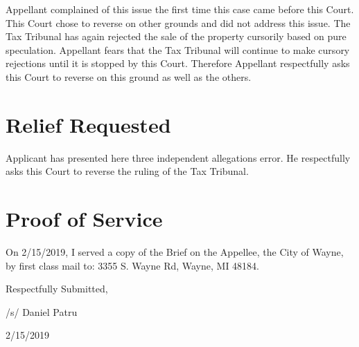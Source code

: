 \documentclass[12pt,\documentclassflag]{michiganCourtOfAppealsBrief}
\begin{document}
Appellant complained of this issue the first time this case came before this Court. This Court chose to reverse on other grounds and did not address this issue. The Tax Tribunal has again rejected the sale of the property cursorily based on pure speculation. Appellant fears that the Tax Tribunal will continue to make cursory rejections until it is stopped by this Court. Therefore Appellant respectfully asks this Court to reverse on this ground as well as the others. 

\section{Relief Requested}

Applicant has presented here three independent allegations error. He respectfully asks this Court to reverse the ruling of the Tax Tribunal. 

\section{Proof of Service}

On 2/15/2019, I served a copy of the Brief on the Appellee, the City of Wayne, by first class mail to: 3355 S. Wayne Rd, Wayne, MI 48184. 

\vspace{1\baselineskip}

{ \setlength{\leftskip}{3.5in}

  Respectfully Submitted,

  /s/ Daniel Patru

  2/15/2019

  \setlength{\leftskip}{0pt}}

\newpage\empty%
\end{document}
